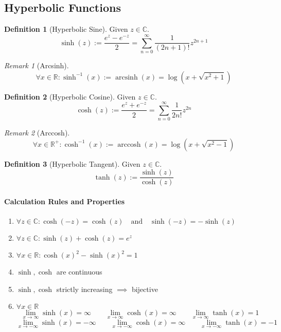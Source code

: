 \documentclass[english,titlepage]{uzhpub}
\DeclareMathOperator\arcsinh{arcsinh}
\DeclareMathOperator\arccosh{arccosh}
\theoremstyle{definition}
\newtheorem{definition}{Definition}[section]
\theoremstyle{plain}
\theoremstyle{remark}
\newtheorem*{remark}{Remark}
\theoremstyle{example}
\begin{document}
   \subsection{Hyperbolic Functions}
   \begin{definition}[Hyperbolic Sine]
      Given \(z \in \mathbb{C}\).
      \[\sinh(z) := \frac{e^z - e^{-z}}{2} = \sum_{n=0}^\infty \frac{1}{(2n + 1)!} z^{2n + 1}\]
   \end{definition}
   \begin{remark}[Arcsinh]
      \[\forall x \in \mathbb{R}: \sinh^{-1}(x) := \arcsinh(x) = \log(x + \sqrt{x^2 + 1})\]
   \end{remark}

   \begin{definition}[Hyperbolic Cosine]
      Given \(z \in \mathbb{C}\).
      \[\cosh(z) := \frac{e^z + e^{-z}}{2} = \sum_{n=0}^\infty \frac{1}{2n!} z^{2n}\]
   \end{definition}
   \begin{remark}[Arccosh]
      \[\forall x \in \mathbb{R}^+: \cosh^{-1}(x) := \arccosh(x) = \log(x + \sqrt{x^2 - 1})\]
   \end{remark}

   \begin{definition}[Hyperbolic Tangent]
      Given \(z \in \mathbb{C}\).
      \[\tanh(z) := \frac{\sinh(z)}{\cosh(z)}\]
   \end{definition}

   \paragraph{Calculation Rules and Properties}
   \begin{enumerate}[label=\roman*, align=Center]
      \item \(\forall z \in \mathbb{C}: \cosh(-z) = \cosh(z) \quad\text{and}\quad \sinh(-z) = -\sinh(z)\)
      \item \(\forall z \in \mathbb{C}: \sinh(z) + \cosh(z) = e^z\)
      \item \(\forall x \in \mathbb{R}: \cosh(x)^2 - \sinh(x)^2 = 1\)
      \item \(\sinh, \cosh\) are continuous
      \item \(\sinh, \cosh\) strictly increasing \(\implies\) bijective
      \item \(\forall x \in \mathbb{R}\)
         \[\lim_{x \to \infty} \sinh(x) = \infty \qquad \lim_{x \to \infty} \cosh(x) = \infty \qquad \lim_{x \to \infty} \tanh(x) = 1\]
         \[\lim_{x \to -\infty} \sinh(x) = -\infty \qquad \lim_{x \to -\infty} \cosh(x) = \infty \qquad \lim_{x \to -\infty} \tanh(x) = -1\]
   \end{enumerate}
\end{document}
